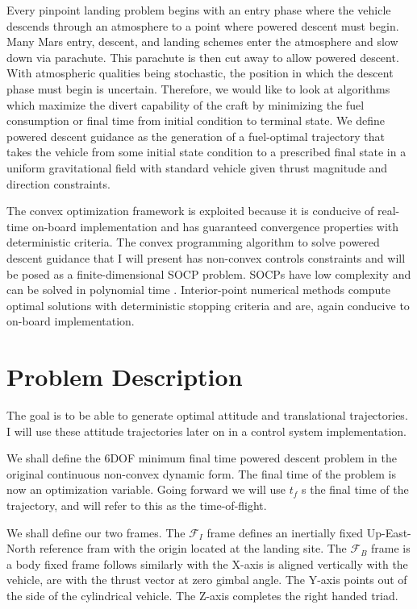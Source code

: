 \documentclass[conf]{new-aiaa}
\begin{document}
\begin{singlespace}
Every pinpoint landing problem begins with an entry phase where the vehicle descends through an atmosphere to a point where powered descent must begin. Many Mars entry, descent, and landing schemes enter the atmosphere and slow down via parachute. This parachute is then cut away to allow powered descent. With atmospheric qualities being stochastic, the position in which the descent phase must begin is uncertain. Therefore, we would like to look at algorithms which maximize the divert capability of the craft by minimizing the fuel consumption or final time from initial condition to terminal state. We define powered descent guidance as the generation of a fuel-optimal trajectory that takes the vehicle from some initial state condition to a prescribed final state in a uniform gravitational field with standard vehicle given thrust magnitude and direction constraints.

The convex optimization framework is exploited because it is conducive of real-time on-board implementation and has guaranteed convergence properties with deterministic criteria. The convex programming algorithm to solve powered descent guidance that I will present has non-convex controls constraints and will be posed as a finite-dimensional SOCP problem. SOCPs have low complexity and can be solved in polynomial time \citep{boyd}. Interior-point numerical methods compute optimal solutions with deterministic stopping criteria and are, again conducive to on-board implementation. 

\section{Problem Description}
The goal is to be able to generate optimal attitude and translational trajectories. I will use these attitude trajectories later on in a control system implementation.

We shall define the 6DOF minimum final time powered descent problem in the original continuous non-convex dynamic form. The final time of the problem is now an optimization variable. Going forward we will use $t_f$ s the final time of the trajectory, and will refer to this as the time-of-flight.

We shall define our two frames. The $\mathcal{F}_I$ frame defines an inertially fixed Up-East-North reference fram with the origin located at the landing site. The $\mathcal{F}_B$ frame is a body fixed frame follows similarly with the X-axis is aligned vertically with the vehicle, are with the thrust vector at zero gimbal angle. The Y-axis points out of the side of the cylindrical vehicle. The Z-axis completes the right handed triad.


\end{singlespace}
\end{document}
